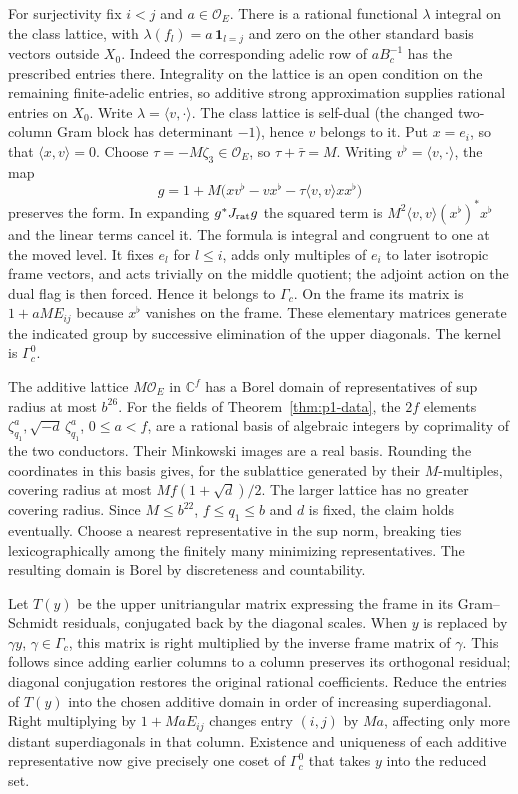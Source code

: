 For surjectivity fix $i<j$ and $a\in\mathcal O_E$. There is a rational
functional $\lambda$ integral on the class lattice, with
$\lambda(f_l)=a\,\mathbf1_{l=j}$ and zero on the other standard
basis vectors outside $X_0$. Indeed the corresponding adelic row of
$aB_c^{-1}$ has the prescribed entries there. Integrality on the
lattice is an open condition on the remaining finite-adelic entries,
so additive strong approximation supplies rational entries on $X_0$.
Write $\lambda=\langle v,\cdot\rangle$. The class lattice is self-dual
(the changed two-column Gram block has determinant $-1$), hence $v$
belongs to it. Put $x=e_i$, so that $\langle x,v\rangle=0$.
Choose $\tau=-M\zeta_3\in\mathcal O_E$, so $\tau+\bar\tau=M$.
Writing $v^\flat=\langle v,\cdot\rangle$, the map
\[
  g=1+M\bigl(xv^\flat-vx^\flat-\tau\langle v,v\rangle x x^\flat\bigr)
\]
preserves the form. In expanding $g^*J_{\rm rat}g$ the squared
term is $M^2\langle v,v\rangle (x^\flat)^*x^\flat$ and the linear
terms cancel it. The formula is integral and congruent to one at the
moved level. It fixes $e_l$ for $l\le i$, adds only multiples of $e_i$
to later isotropic frame vectors, and acts trivially on the middle
quotient; the adjoint action on the dual flag is then forced. Hence
it belongs to $\Gamma_c$. On the frame its matrix is $1+aM E_{ij}$
because $x^\flat$ vanishes on the frame. These elementary matrices
generate the indicated group by successive elimination of the upper
diagonals. The kernel is $\Gamma_c^0$.

The additive lattice $M\mathcal O_E$ in $\mathbb C^f$ has a Borel
domain of representatives of sup radius at most $b^{26}$.
For the fields of Theorem~\ref{thm:p1-data}, the $2f$ elements
$\zeta_{q_1}^a,\sqrt{-d}\,\zeta_{q_1}^a$, $0\le a<f$, are a
rational basis of algebraic integers by coprimality of the two
conductors. Their Minkowski images are a real basis. Rounding the
coordinates in this basis gives, for the sublattice generated by
their $M$-multiples, covering radius at most
$Mf(1+\sqrt d)/2$. The larger lattice has no greater covering
radius. Since $M\le b^{22}$, $f\le q_1\le b$ and $d$ is fixed,
the claim holds eventually. Choose a nearest representative in
the sup norm, breaking ties lexicographically among the finitely
many minimizing representatives. The resulting domain is Borel
by discreteness and countability.

Let $T(y)$ be the upper unitriangular matrix expressing the frame in
its Gram--Schmidt residuals, conjugated back by the diagonal scales.
When $y$ is replaced by $\gamma y$, $\gamma\in\Gamma_c$, this matrix
is right multiplied by the inverse frame matrix of $\gamma$. This
follows since adding earlier columns to a column preserves its
orthogonal residual; diagonal conjugation restores the original
rational coefficients. Reduce the entries of $T(y)$ into the chosen
additive domain in order of increasing superdiagonal. Right
multiplying by $1+M a E_{ij}$ changes entry $(i,j)$ by $Ma$,
affecting only more distant superdiagonals in that column. Existence
and uniqueness of each additive representative now give precisely one
coset of $\Gamma_c^0$ that takes $y$ into the reduced set.

